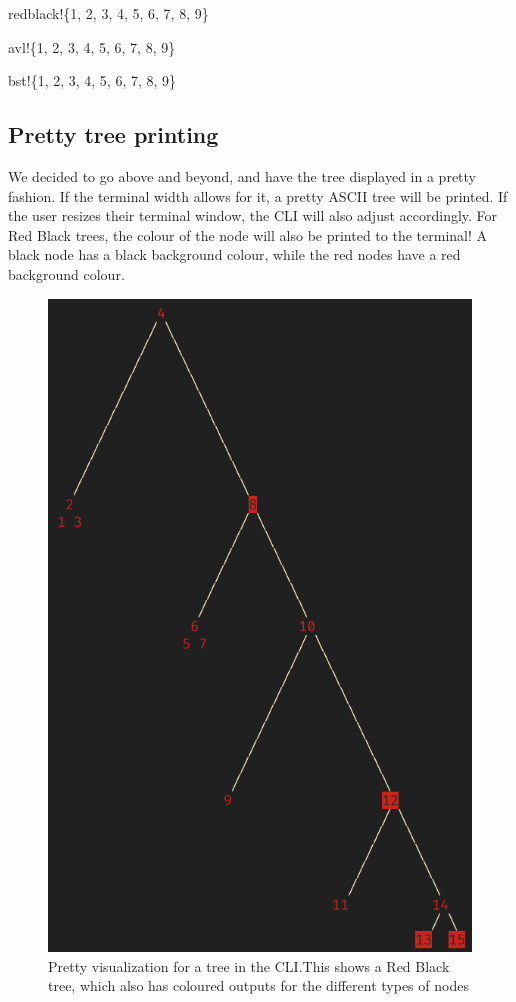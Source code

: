\documentclass[letterpaper]{article}
\begin{document}
\begin{texttt}
  redblack!\{1, 2, 3, 4, 5, 6, 7, 8, 9\}
\end{texttt}

\begin{texttt}
  avl!\{1, 2, 3, 4, 5, 6, 7, 8, 9\}
\end{texttt}

\begin{texttt}
  bst!\{1, 2, 3, 4, 5, 6, 7, 8, 9\}
\end{texttt}

\subsection{Pretty tree printing}
We decided to go above and beyond, and have the tree displayed in a pretty
fashion. If the terminal width allows for it, a pretty ASCII tree will be
printed. If the user resizes their terminal window, the CLI will also adjust
accordingly.  For Red Black trees, the colour of the node will also be printed
to the terminal! A black node has a black background colour, while the red nodes
have a red background colour.
\begin{figure}[H]
      \centering
      \includegraphics[width=.8\textwidth]{rbtree.png}
      \caption{Pretty visualization for a tree in the CLI.\@ This shows a Red
      Black tree, which also has coloured outputs for the different types of
      nodes}
\end{figure}
\end{document}
